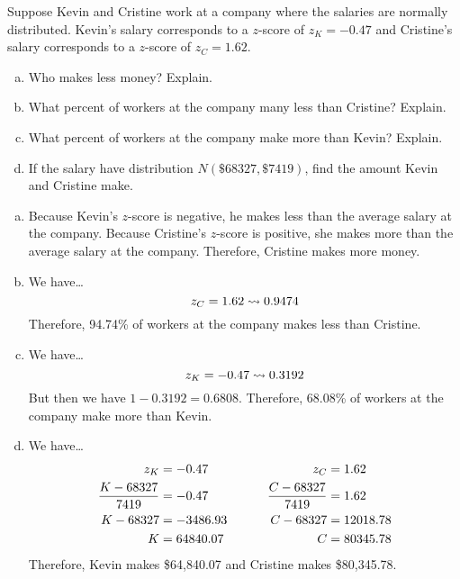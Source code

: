 \documentclass[11pt,letterpaper]{article}
\begin{document}

 Suppose Kevin and Cristine work at a company where the salaries are normally distributed. Kevin's salary corresponds to a $z$-score of $z_K= -0.47$ and Cristine's salary corresponds to a $z$-score of $z_C= 1.62$. 
	\begin{enumerate}[(a)]
	\item Who makes less money? Explain.
	\item What percent of workers at the company many less than Cristine? Explain.
	\item What percent of workers at the company make more than Kevin? Explain.
	\item If the salary have distribution $N(\$68327, \$7419)$, find the amount Kevin and Cristine make. 
	\end{enumerate} \pspace

\sol 
\begin{enumerate}[(a)]
\item Because Kevin's $z$-score is negative, he makes less than the average salary at the company. Because Cristine's $z$-score is positive, she makes more than the average salary at the company. Therefore, Cristine makes more money. \pspace

\item We have\dots
	\[
	z_C= 1.62 \rightsquigarrow 0.9474
	\]
Therefore, 94.74\% of workers at the company makes less than Cristine. \pspace

\item We have\dots
	\[
	z_K= -0.47 \rightsquigarrow 0.3192
	\]
But then we have $1- 0.3192= 0.6808$. Therefore, 68.08\% of workers at the company make more than Kevin. \pspace

\item We have\dots
	\[
	\begin{aligned}
	z_K&= -0.47 \hspace{1.3cm}& z_C&= 1.62 \\
	\dfrac{K - 68327}{7419}&= -0.47 & \dfrac{C - 68327}{7419}&= 1.62 \\
	K - 68327&= -3486.93 & C - 68327&= 12018.78 \\
	K&= 64840.07 & C&= 80345.78
	\end{aligned}
	\]
Therefore, Kevin makes \$64,840.07 and Cristine makes \$80,345.78.
\end{enumerate}
\end{document}
